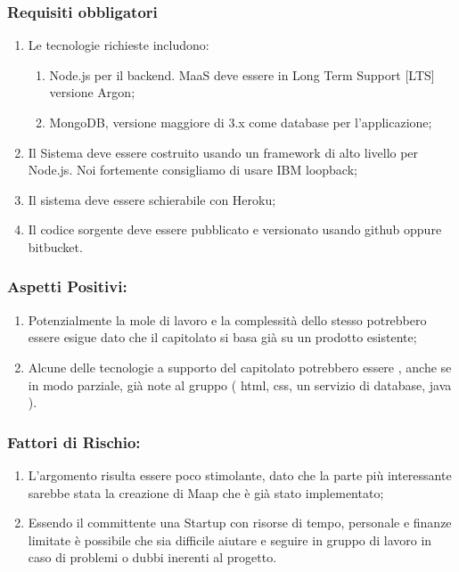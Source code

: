 \documentclass[12pt,a4paper]{article}
\begin{document}
\subsubsection{Requisiti obbligatori}
\begin{enumerate}




\item	Le tecnologie richieste includono:

\begin{enumerate}



\item Node.js per il backend. MaaS deve essere in Long Term Support [LTS] versione Argon;

\item	MongoDB, versione maggiore di 3.x come database per l'applicazione; 

\end{enumerate}

\item Il Sistema deve essere costruito usando un framework di alto livello per Node.js. Noi fortemente consigliamo di usare IBM loopback;

\item Il sistema deve essere schierabile con Heroku;
 
\item	Il codice sorgente deve essere pubblicato e versionato   usando github oppure bitbucket. 
\end{enumerate}
\subsubsection{Aspetti Positivi:}
\begin{enumerate}


\item	Potenzialmente la mole di lavoro e la complessità dello stesso potrebbero essere esigue dato che il capitolato si basa già su un prodotto esistente;

\item	Alcune delle tecnologie a supporto del capitolato potrebbero essere , anche se in modo parziale, già note al gruppo ( html, css, un servizio di	database, java ).
\end{enumerate}
\subsubsection{Fattori di Rischio:}
	\begin{enumerate}
\item	L'argomento risulta essere poco stimolante, dato che la parte più interessante sarebbe stata la creazione di Maap che è già stato implementato;

\item	Essendo il committente una Startup con risorse di tempo, personale e	finanze limitate è possibile che sia difficile aiutare e seguire in	gruppo di lavoro in caso di problemi o dubbi inerenti al progetto.
\end{enumerate}
\end{document}
